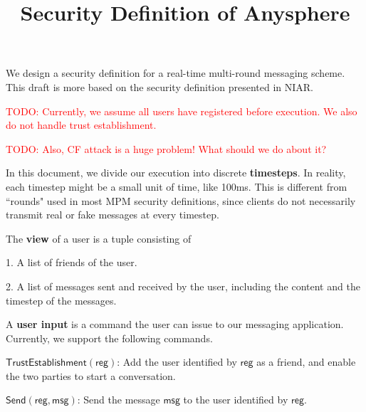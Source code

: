 \documentclass[sigconf, nonacm, balance=false, natbib=false, screen]{acmart}
\title{Security Definition of Anysphere}
\newcommand\todo[1]{\textcolor{red}{TODO: #1}}
\newcommand{\msg}{\mathsf{msg}}
\newcommand{\reg}{\mathsf{reg}}
\begin{document}
\maketitle
We design a security definition for a real-time multi-round messaging scheme. This draft is more based on the security definition presented in NIAR.

\todo{Currently, we assume all users have registered before execution. We also do not handle trust establishment.}

\todo{Also, CF attack is a huge problem! What should we do about it?}
\begin{definition}
In this document, we divide our execution into discrete \textbf{timesteps}. In reality, each timestep might be a small unit of time, like 100ms. This is different from ``rounds" used in most MPM security definitions, since clients do not necessarily transmit real or fake messages at every timestep.
\end{definition}
\begin{definition}
The \textbf{view} of a user is a tuple consisting of

1. A list of friends of the user.

2. A list of messages sent and received by the user, including the content and the timestep of the messages.
\end{definition}
\begin{definition}
A \textbf{user input} is a command the user can issue to our messaging application. Currently, we support the following commands.

$\mathsf{TrustEstablishment}(\reg)$: Add the user identified by $\reg$ as a friend, and enable the two parties to start a conversation.

$\mathsf{Send}(\reg, \msg)$: Send the message $\msg$ to the user identified by $\reg$.


\end{definition}
\end{document}
